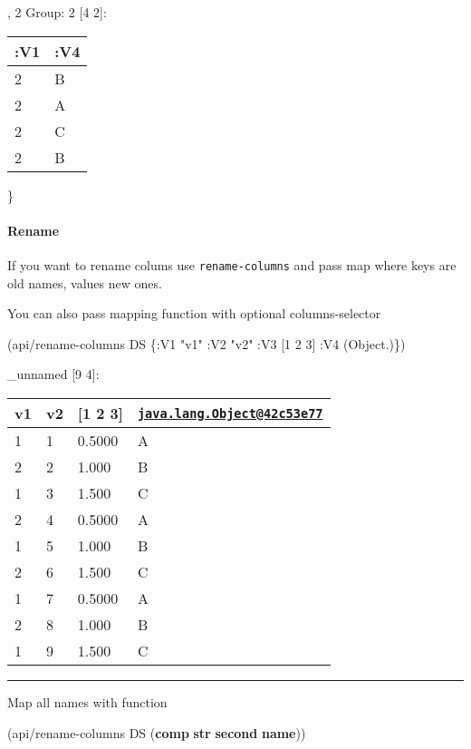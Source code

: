 \documentclass[]{article}
\newenvironment{Shaded}{\begin{snugshade}}{\end{snugshade}}
\newcommand{\KeywordTok}[1]{\textcolor[rgb]{0.13,0.29,0.53}{\textbf{#1}}}
\newcommand{\DecValTok}[1]{\textcolor[rgb]{0.00,0.00,0.81}{#1}}
\newcommand{\StringTok}[1]{\textcolor[rgb]{0.31,0.60,0.02}{#1}}
\newcommand{\AttributeTok}[1]{\textcolor[rgb]{0.77,0.63,0.00}{#1}}
\newcommand{\NormalTok}[1]{#1}
\let\oldparagraph\paragraph
\renewcommand{\paragraph}[1]{\oldparagraph{#1}\mbox{}}
\begin{document}
, 2 Group: 2 {[}4 2{]}:

\begin{longtable}[]{@{}ll@{}}
\toprule
:V1 & :V4\tabularnewline
\midrule
\endhead
2 & B\tabularnewline
2 & A\tabularnewline
2 & C\tabularnewline
2 & B\tabularnewline
\bottomrule
\end{longtable}

\}

\paragraph{Rename}\label{rename}

If you want to rename colums use \texttt{rename-columns} and pass map
where keys are old names, values new ones.

You can also pass mapping function with optional columns-selector

\begin{Shaded}
\begin{Highlighting}[]
\NormalTok{(api/rename-columns DS \{}\AttributeTok{:V1} \StringTok{"v1"}
                        \AttributeTok{:V2} \StringTok{"v2"}
                        \AttributeTok{:V3}\NormalTok{ [}\DecValTok{1} \DecValTok{2} \DecValTok{3}\NormalTok{]}
                        \AttributeTok{:V4}\NormalTok{ (Object.)\})}
\end{Highlighting}
\end{Shaded}

\_unnamed {[}9 4{]}:

\begin{longtable}[]{@{}llll@{}}
\toprule
v1 & v2 & {[}1 2 3{]} &
\href{mailto:java.lang.Object@42c53e77}{\nolinkurl{java.lang.Object@42c53e77}}\tabularnewline
\midrule
\endhead
1 & 1 & 0.5000 & A\tabularnewline
2 & 2 & 1.000 & B\tabularnewline
1 & 3 & 1.500 & C\tabularnewline
2 & 4 & 0.5000 & A\tabularnewline
1 & 5 & 1.000 & B\tabularnewline
2 & 6 & 1.500 & C\tabularnewline
1 & 7 & 0.5000 & A\tabularnewline
2 & 8 & 1.000 & B\tabularnewline
1 & 9 & 1.500 & C\tabularnewline
\bottomrule
\end{longtable}

\begin{center}\rule{0.5\linewidth}{0.5pt}\end{center}

Map all names with function

\begin{Shaded}
\begin{Highlighting}[]
\NormalTok{(api/rename-columns DS (}\KeywordTok{comp} \KeywordTok{str} \KeywordTok{second} \KeywordTok{name}\NormalTok{))}
\end{Highlighting}
\end{Shaded}
\end{document}
